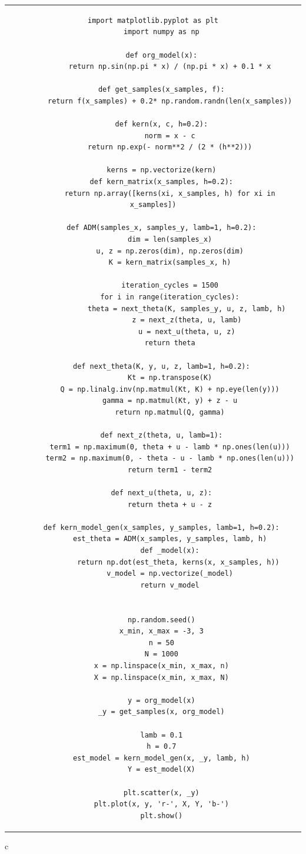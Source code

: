 \documentclass[fleqn]{jsarticle}
\begin{document}
\begin{center}
\begin{tabular}{c}
  \begin{lstlisting}[]
    import matplotlib.pyplot as plt
    import numpy as np

    def org_model(x):
        return np.sin(np.pi * x) / (np.pi * x) + 0.1 * x

    def get_samples(x_samples, f):
        return f(x_samples) + 0.2* np.random.randn(len(x_samples))

    def kern(x, c, h=0.2):
        norm = x - c
        return np.exp(- norm**2 / (2 * (h**2)))

    kerns = np.vectorize(kern)
    def kern_matrix(x_samples, h=0.2):
        return np.array([kerns(xi, x_samples, h) for xi in x_samples])

    def ADM(samples_x, samples_y, lamb=1, h=0.2):
        dim = len(samples_x)
        u, z = np.zeros(dim), np.zeros(dim)
        K = kern_matrix(samples_x, h)

        iteration_cycles = 1500
        for i in range(iteration_cycles):
                theta = next_theta(K, samples_y, u, z, lamb, h)
                z = next_z(theta, u, lamb)
                u = next_u(theta, u, z)
        return theta

    def next_theta(K, y, u, z, lamb=1, h=0.2):
        Kt = np.transpose(K)
        Q = np.linalg.inv(np.matmul(Kt, K) + np.eye(len(y)))
        gamma = np.matmul(Kt, y) + z - u
        return np.matmul(Q, gamma)

    def next_z(theta, u, lamb=1):
        term1 = np.maximum(0, theta + u - lamb * np.ones(len(u)))
        term2 = np.maximum(0, - theta - u - lamb * np.ones(len(u)))
        return term1 - term2

    def next_u(theta, u, z):
        return theta + u - z

    def kern_model_gen(x_samples, y_samples, lamb=1, h=0.2):
        est_theta = ADM(x_samples, y_samples, lamb, h)
        def _model(x):
            return np.dot(est_theta, kerns(x, x_samples, h))
        v_model = np.vectorize(_model)
        return v_model


    np.random.seed()
    x_min, x_max = -3, 3
    n = 50
    N = 1000
    x = np.linspace(x_min, x_max, n)
    X = np.linspace(x_min, x_max, N)

    y = org_model(x)
    _y = get_samples(x, org_model)

    lamb = 0.1
    h = 0.7
    est_model = kern_model_gen(x, _y, lamb, h)
    Y = est_model(X)

    plt.scatter(x, _y)
    plt.plot(x, y, 'r-', X, Y, 'b-')
    plt.show()
  \end{lstlisting}
\end{tabular}{c}
\end{center}
\end{document}
